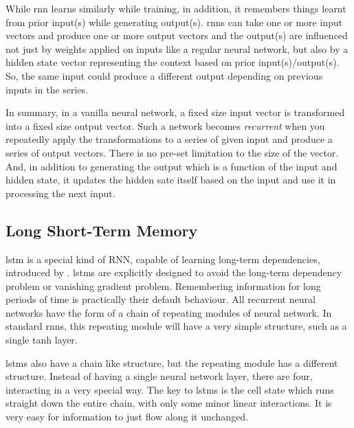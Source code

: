         While \gls{rnn} learns similarly while training, in addition, it remembers things learnt from prior input(s) while generating output(s). \gls{rnn}s can take one or more input vectors and produce one or more output vectors and the output(s) are influenced not just by weights applied on inputs like a regular neural network, but also by a hidden state vector representing the context based on prior input(s)/output(s). So, the same input could produce a different output depending on previous inputs in the series.
        
        In summary, in a vanilla neural network, a fixed size input vector is transformed into a fixed size output vector. Such a network becomes \textit{recurrent} when you repeatedly apply the transformations to a series of given input and produce a series of output vectors. There is no pre-set limitation to the size of the vector. And, in addition to generating the output which is a function of the input and hidden state, it updates the hidden sate itself based on the input and use it in processing the next input.
        
    
    \subsection{Long Short-Term Memory}
        \gls{lstm} is a special kind of RNN, capable of learning long-term dependencies, introduced by \autocite{Hochreiter1997LongSM}. \gls{lstm}s are explicitly designed to avoid the long-term dependency problem or vanishing gradient problem. Remembering information for long periods of time is practically their default behaviour. All recurrent neural networks have the form of a chain of repeating modules of neural network. In standard \gls{rnn}s, this repeating module will have a very simple structure, such as a single tanh layer.
        
        \gls{lstm}s also have a chain like structure, but the repeating module has a different structure. Instead of having a single neural network layer, there are four, interacting in a very special way. The key to \gls{lstm}s is the cell state which runs straight down the entire chain, with only some minor linear interactions. It is very easy for information to just flow along it unchanged.
        
